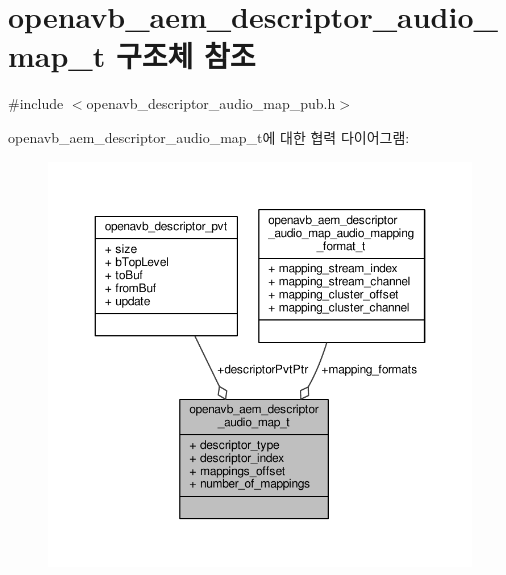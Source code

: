 \hypertarget{structopenavb__aem__descriptor__audio__map__t}{}\section{openavb\+\_\+aem\+\_\+descriptor\+\_\+audio\+\_\+map\+\_\+t 구조체 참조}
\label{structopenavb__aem__descriptor__audio__map__t}


{\ttfamily \#include $<$openavb\+\_\+descriptor\+\_\+audio\+\_\+map\+\_\+pub.\+h$>$}



openavb\+\_\+aem\+\_\+descriptor\+\_\+audio\+\_\+map\+\_\+t에 대한 협력 다이어그램\+:
\nopagebreak
\begin{figure}[H]
\begin{center}
\leavevmode
\includegraphics[width=350pt]{structopenavb__aem__descriptor__audio__map__t__coll__graph}
\end{center}
\end{figure}
